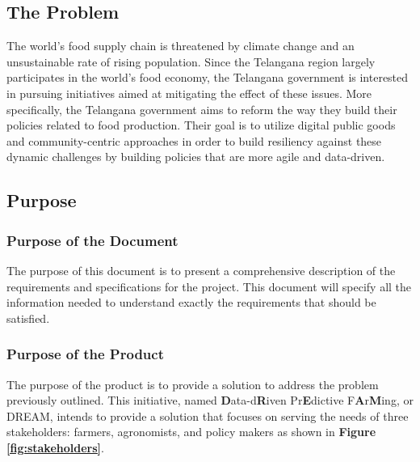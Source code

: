 \setcounter{goals_counter}{1}
\subsection{The Problem}
\begin{flushleft}
The world's food supply chain is threatened by climate change and an unsustainable rate of rising population. Since the Telangana region largely participates in the world's food economy, the Telangana government is interested in pursuing initiatives aimed at mitigating the effect of these issues. More specifically, the Telangana government aims to reform the way they build their policies related to food production. Their goal is to utilize digital public goods and community-centric approaches in order to build resiliency against these dynamic challenges by building policies that are more agile and data-driven. 
\end{flushleft}
\subsection{Purpose}
\subsubsection{Purpose of the Document}
\begin{flushleft}
The purpose of this document is to present a comprehensive description of the requirements and specifications for the project. This document will specify all the information needed to understand exactly the requirements that should be satisfied. 
\end{flushleft} 

\subsubsection{Purpose of the Product}
The purpose of the product is to provide a solution to address the problem previously outlined. 
This initiative, named {\bf D}ata-d{\bf R}iven Pr{\bf E}dictive F{\bf A}r{\bf M}ing, or DREAM, intends to provide a solution that focuses on serving the needs of three stakeholders: farmers, agronomists, and policy makers as shown in \textbf{Figure \ref{fig:stakeholders}}.


